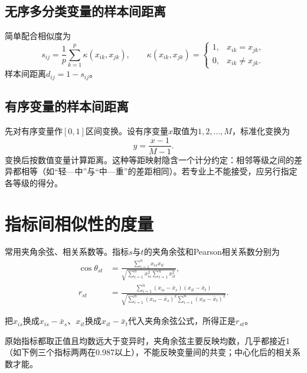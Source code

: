 \subsection{无序多分类变量的样本间距离}
简单配合相似度为
\[
s_{ij}=\frac1p\sum_{k=1}^p\kappa(x_{ik},x_{jk}),\qquad
\kappa(x_{ik},x_{jk})=\begin{cases}1,&x_{ik}=x_{jk},\\0,&x_{ik}\ne x_{jk}.\end{cases}
\]
样本间距离$d_{ij}=1-s_{ij}$。
\subsection{有序变量的样本间距离}
先对有序变量作$[0,1]$区间变换。设有序变量$x$取值为$1,2,\ldots,M$，标准化变换为
\[
y=\frac{x-1}{M-1}.
\]
变换后按数值变量计算距离。这种等距映射隐含一个计分约定：相邻等级之间的差异都相等（如“轻—中”与“中—重”的差距相同）。若专业上不能接受，应另行指定各等级的得分。
\section{指标间相似性的度量}
常用夹角余弦、相关系数等。指标$s$与$t$的夹角余弦和Pearson相关系数分别为
\begin{align}
\cos\theta_{st}&=\frac{\sum_{i=1}^n x_{is}x_{it}}{\sqrt{\sum_{i=1}^nx_{is}^2\sum_{i=1}^nx_{it}^2}},\\
r_{st}&=\frac{\sum_{i=1}^n(x_{is}-\bar x_s)(x_{it}-\bar x_t)}
{\sqrt{\sum_{i=1}^n(x_{is}-\bar x_s)^2\sum_{i=1}^n(x_{it}-\bar x_t)^2}}.
\end{align}
\begin{zm}[中心化向量的夹角余弦等于Pearson相关系数]
把$x_{is}$换成$x_{is}-\bar x_s$、$x_{it}$换成$x_{it}-\bar x_t$代入夹角余弦公式，所得正是$r_{st}$。
\end{zm}
原始指标都取正值且均数远大于变异时，夹角余弦主要反映均数，几乎都接近1（如下例三个指标两两在0.987以上），不能反映变量间的共变；中心化后的相关系数才能。

